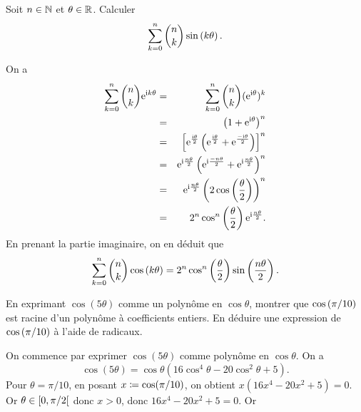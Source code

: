 \documentclass{magnoliaold}
\begin{document}
\begin{exos}
\exo Soit $n\in\mathbb{N}$ et $\theta\in\mathbb{R}$. Calculer
  \[\sum_{k=0}^n \binom{n}{k}\sin\left(k\theta\right).\]
  \begin{sol}
  On a
  \begin{eqnarray*}
 \sum_{k=0}^{n}\binom{n}{k}{\rm e}^{{\rm i} k\theta}
 &=& \sum_{k=0}^{n}\binom{n}{k}({\rm e}^{{\rm i}\theta})^k\\
 &=& \left(1+{\rm e}^{{\rm i}\theta}\right)^n\\
 &=& \left[{\rm e}^{\frac{{\rm i}\theta}{2}}\left({\rm e}^{\frac{{\rm i}\theta}{2}}+{\rm e}^{\frac{-{\rm i}\theta}{2}}\right)\right]^n\\
 &=& {\rm e}^{{\rm i}\frac{n\theta}{2}}\left( {\rm e}^{{\rm i}\frac{-n\theta}{2}}+{\rm e}^{{\rm i}\frac{n\theta}{2}}\right)^{n}\\
 &=& {\rm e}^{{\rm i}\frac{n\theta}{2}}\left( 2\cos\left( \frac{\theta}{2}\right) \right) ^{n}\\
 &=& 2^n \cos^n\left(\frac{\theta}{2}\right){\rm e}^{{\rm i}\frac{n\theta}{2}}.
  \end{eqnarray*}
  En prenant la partie imaginaire, on en déduit que
  \[\sum_{k=0}^n \binom{n}{k}\cos\left(k\theta\right)=2^n \cos^n\left(\frac{\theta}{2}\right)\sin\left(\frac{n\theta}{2}\right).\]
  \end{sol}
\exo En exprimant $\cos(5\theta)$ comme un polynôme en $\cos\theta$,
  montrer que $\cos\left(\pi/10\right)$ est racine d'un polynôme à
  coefficients entiers. En déduire une expression de $\cos\left(\pi/10\right)$ à l'aide de radicaux.
\begin{sol}
On commence par exprimer $\cos(5\theta)$ comme polynôme en $\cos\theta$. On a
\[\cos (5\theta)=\cos \theta(16\cos^{4}\theta -20\cos^{2}\theta +5).\]
Pour $\theta=\pi/10$, en posant $x\coloneqq\cos(\pi/10)$, on obtient $x(16x^4-20x^2+5)=0$. Or $\theta\in\left[0,\pi/2\right[$ donc $x>0$, donc $16x^4-20x^2+5=0$. Or

\end{sol}
\end{exos}
\end{document}
